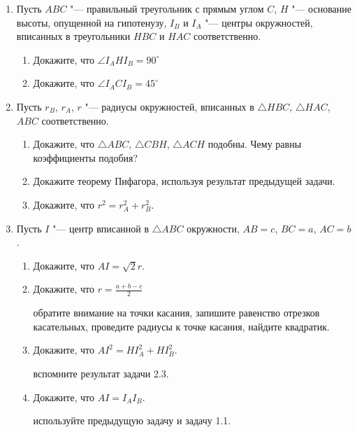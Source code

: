 \documentclass[12pt]{article}
\begin{document}
\begin{enumerate}[\bf 1.]
    
\item
Пусть $ABC$ "--- правильный треугольник с прямым углом $C$, $H$ "--- основание высоты, опущенной на гипотенузу, $I_B$ и $I_A$ "--- центры окружностей, вписанных в треугольники $HBC$ и $HAC$ соответственно.

\begin{enumerate}[1.]
    \item Докажите, что $\angle I_A H I_B = 90^\circ$
    \item Докажите, что $\angle I_A C I_B = 45^\circ$
\end{enumerate}

\item
Пусть $r_B$, $r_A$, $r$ "--- радиусы окружностей, вписанных в $\triangle HBC$, $\triangle HAC$, $ABC$ соответственно. 
\begin{enumerate}[1.]
    \item Докажите, что $\triangle ABC$, $ \triangle CBH$,  $\triangle ACH$ подобны. Чему равны коэффициенты подобия?
    \item Докажите теорему Пифагора, используя результат предыдущей задачи.
    \item Докажите, что $r^2 = r_A^2 + r_B^2$.
\end{enumerate}

\item
Пусть $I$ "--- центр вписанной в $\triangle ABC$ окружности, $AB = c$, $BC = a$, $AC = b$.
\begin{enumerate}[1.]
    \item Докажите, что $AI = \sqrt{2} r$.
    \item Докажите, что $r = \frac{a+b-c}{2}$
    \begin{leftbar}
    обратите внимание на точки касания, запишите равенство отрезков касательных, проведите радиусы к точке касания, найдите квадратик.
    \end{leftbar}
    
    \item
    Докажите, что $AI^2 = HI_A^2 + HI_B^2$.
    \begin{leftbar}
    вспомните результат задачи 2.3.
    \end{leftbar}
    
    \item
    Докажите, что $AI = I_AI_B$.
    \begin{leftbar}
    используйте предыдущую задачу и задачу 1.1.
    \end{leftbar}


\end{enumerate}
\end{enumerate}
\end{document}
